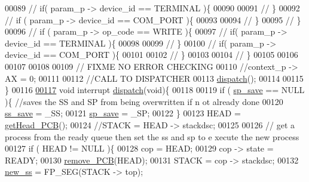 \begin{DoxyCode}
00089                 \textcolor{comment}{// if( param\_p -> device\_id == TERMINAL )\{}
00090                 
00091                 \textcolor{comment}{// \}}
00092                 \textcolor{comment}{// if ( param\_p -> device\_id == COM\_PORT )\{}
00093                 
00094                 \textcolor{comment}{// \}}
00095         \textcolor{comment}{// \}}
00096         \textcolor{comment}{// if ( param\_p -> op\_code == WRITE )\{}
00097                 \textcolor{comment}{// if( param\_p -> device\_id == TERMINAL )\{}
00098                 
00099                 \textcolor{comment}{// \}}
00100                 \textcolor{comment}{// if( param\_p -> device\_id == COM\_PORT )\{}
00101                 
00102                 \textcolor{comment}{// \}}
00103                 
00104         \textcolor{comment}{// \}}
00105         
00106         
00107 
00108         
00109         \textcolor{comment}{// FIXME NO ERROR CHECKING }
00110         \textcolor{comment}{//context\_p -> AX = 0;}
00111         
00112         \textcolor{comment}{//CALL TO DISPATCHER}
00113         \hyperlink{mpx__r3_8c_ad4150c832feb766384417ab7bae70089}{dispatch}();
00114         
00115 \}
00116 
\hypertarget{mpx__r3_8c_source_l00117}{}\hyperlink{_m_p_x___r3_8_h_ad4150c832feb766384417ab7bae70089}{00117} \textcolor{keywordtype}{void} interrupt \hyperlink{mpx__r3_8c_ad4150c832feb766384417ab7bae70089}{dispatch}(\textcolor{keywordtype}{void})\{
00118         
00119         \textcolor{keywordflow}{if} ( \hyperlink{mpx__r3_8c_a8687fceb4a02634b3967391b0b584c4c}{sp_save} == NULL )\{ \textcolor{comment}{//saves the SS and SP from being overwritten if n
      ot already done}
00120                 \hyperlink{mpx__r3_8c_aab74ba3fd0cd88eb3e908a0916cf39ca}{ss_save} = \_SS;
00121                 \hyperlink{mpx__r3_8c_a8687fceb4a02634b3967391b0b584c4c}{sp_save} = \_SP;
00122                 \}
00123                 HEAD = \hyperlink{mpx__r3_8c_aa7b04f866ead346c0357975285de0c38}{getHead_PCB}();
00124                 \textcolor{comment}{//STACK = HEAD -> stackdsc;}
00125                 
00126                 \textcolor{comment}{// get a process from the ready queue then set the ss and sp to e
      xecute the new process}
00127                 \textcolor{keywordflow}{if} ( HEAD != NULL )\{
00128                         cop = HEAD;
00129                         cop -> state = READY;
00130                         \hyperlink{mpx__r2_8c_af30a3658210d449b4b53e5be2ed2bc2e}{remove_PCB}(HEAD);
00131                         STACK = cop -> stackdsc;
00132                         \hyperlink{mpx__r3_8c_a15a3c2a819d08f7ea4c3f453ca0f7f9c}{new_ss} = FP\_SEG(STACK -> top);

\end{DoxyCode}

